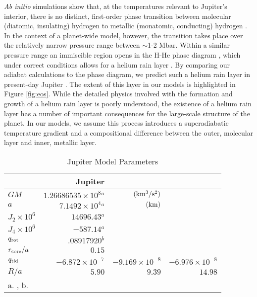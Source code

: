 \textit{Ab initio} simulations show that, at the temperatures relevant to Jupiter's
interior, there is no distinct, first-order phase transition between molecular
(diatomic, insulating) hydrogen to metallic (monatomic, conducting) hydrogen
\citep{vorberger2007}. In the context of a planet-wide model, however, the transition
takes place over the relatively narrow pressure range between $\sim$1-2 Mbar. Within
a similar pressure range an immiscible region opens in the H-He phase diagram
\cite{morales2013}, which under correct conditions allows for a helium rain layer
\cite{stevenson1977a,stevenson1977b}. By comparing our adiabat calculations to the
\cite{morales2013} phase diagram, we predict such a helium rain layer in present-day
Jupiter \citep{hubbard2016}. The extent of this layer in our models is highlighted in
Figure \ref{fig:eos}. While the detailed physics involved with the formation and
growth of a helium rain layer is poorly understood, the existence of a helium rain
layer has a number of important consequences for the large-scale structure of the
planet. In our models, we assume this process introduces a superadiabatic temperature
gradient and a compositional difference between the outer, molecular layer and inner,
metallic layer.


\begin{table}
\centering

\caption{Jupiter Model Parameters \label{tab:jupiter_params}}
\begin{tabular}{l|rrr}
    \hline
    {} & {Jupiter} & {} & {} \\
    \hline
$GM$ & $1.26686535 \times 10^{8}$$^a$  &  ${\rm (km^3/s^2) }$  & \\
$a$ & $7.1492 \times 10^{4}$$^a$         & ${\rm (km) }$   & \\ 
$J_2  \times  10^6$  & $14696.43$$^a$   &        & \\
$J_4  \times  10^6$  & $-587.14$$^a$  &        & \\
$q_{\rm rot} $  & $ .08917920 $$^b$   & & \\
$r_{\rm core} / a$ & $0.15$  & \\ 
\hline \hline
$q_{\rm tid} $  & $-6.872 \times 10^{-7} $ & $-9.169\times 10^{-8 }$  
&  $-6.976\times10^{-8}$  \\
$R/a$  & $5.90$  &  $9.39$  & $14.98$ \\
\hline
\multicolumn{4}{l}{ a. \citet{jacobson2003}, b. \citet{archinal2011}}
\end{tabular}

\end{table}

